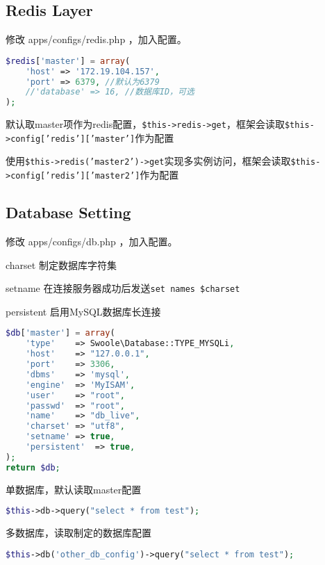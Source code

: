 \subsection{Redis Layer}


修改 apps/configs/redis.php ，加入配置。



\begin{lstlisting}[language=PHP]
$redis['master'] = array(
    'host' => '172.19.104.157',
    'port' => 6379, //默认为6379
    //'database' => 16, //数据库ID，可选
);
\end{lstlisting}


\begin{compactitem}
\item 默认取master项作为redis配置，\texttt{\$this->redis->get}，框架会读取\texttt{\$this->config['redis']['master']}作为配置
\item 使用\texttt{\$this->redis('master2')->get}实现多实例访问，框架会读取\texttt{\$this->config['redis']['master2']}作为配置
\end{compactitem}


\subsection{Database Setting}

修改 apps/configs/db.php ，加入配置。


\begin{compactitem}
\item charset 制定数据库字符集
\item setname 在连接服务器成功后发送\texttt{set names \$charset}
\item persistent 启用MySQL数据库长连接
\end{compactitem}


\begin{lstlisting}[language=PHP]
$db['master'] = array(
    'type'    => Swoole\Database::TYPE_MYSQLi,
    'host'    => "127.0.0.1",
    'port'    => 3306,
    'dbms'    => 'mysql',
    'engine'  => 'MyISAM',
    'user'    => "root",
    'passwd'  => "root",
    'name'    => "db_live",
    'charset' => "utf8",
    'setname' => true,
    'persistent'  => true,
);
return $db;
\end{lstlisting}

\begin{compactitem}
\item 单数据库，默认读取master配置

\begin{lstlisting}[language=PHP]
$this->db->query("select * from test");
\end{lstlisting}

\item 多数据库，读取制定的数据库配置

\begin{lstlisting}[language=PHP]
$this->db('other_db_config')->query("select * from test");
\end{lstlisting}
\end{compactitem}

